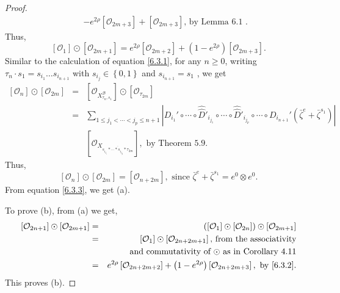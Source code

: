 \documentclass{article}
\def\B{\mathcal{B}}
\def\ref#1{#1}
\begin{document}
\begin{proof}
\begin{eqnarray*}
&&- e^{2\rho} \left[\mathcal{O}_{2m+3}\right] +\left[\mathcal{O}_{2m+3}\right] \mbox{, by Lemma \ref{6.1} }.
\end{eqnarray*}
Thus, 
\begin{equation}\label{6.3.2}
\left[ \mathcal{O}_{1}\right] \odot \left[ \mathcal{O}_{2m+1}\right] = e^{2\rho} \left[\mathcal{O}_{2m+2}\right] +\left(1-e^{2\rho} \right)\left[\mathcal{O}_{2m+3}\right].
\end{equation}
Similar to the calculation of equation \eqref{6.3.1}, for any $n\geq 0$, writing $\tau_n\cdot s_1=s_{i_1}\ldots s_{i_{n+1}}$ with $s_{i_j}\in \left\{ 0,1\right\}$ and $s_{i_{n+1}}=s_1$ , we get
\begin{eqnarray*}
\left[ \mathcal{O}_{n}\right] \odot \left[ \mathcal{O}_{2m}\right]  &=& \left[ \mathcal{O}_{X_{\tau_n,s_1}^\B}\right] \odot \left[\mathcal{O}_{\tau_{2m}}\right]\\
&=& \sum_{1\leq j_1 <\cdots < j_p \leq n+1}\left\vert D_{i_1}' \circ \cdots \circ \hat{\hat{D}}'_{i_{j_1}}\circ \cdots \circ \hat{\hat{D}}'_{i_{j_p}}\circ \cdots \circ D_{i_{n+1}}'\left(\bar{\zeta}^e+\bar{\zeta}^{s_1}\right) \right\vert \\
&&[ \mathcal{O}_{X_{\overline{s_{i_{j_1}}*\cdots * s_{i_{j_p}}*\tau_{2m}}}}],\mbox{ by Theorem \ref{5.9}} .
\end{eqnarray*}
Thus,
\begin{equation}\label{6.3.3}
\left[ \mathcal{O}_{n}\right] \odot \left[ \mathcal{O}_{2m}\right] =  \left[ \mathcal{O}_{n+2m}\right] ,\mbox{ since } \bar{\zeta}^e+\bar{\zeta}^{s_1} = e^0 \otimes e^0.
\end{equation}
From equation \eqref{6.3.3}, we get (a). 

To prove (b), from (a) we get,
\begin{eqnarray*}
\left[ \mathcal{O}_{2n+1}\right] \odot \left[ \mathcal{O}_{2m+1}\right]  &=& \left(\left[ \mathcal{O}_{1}\right] \odot \left[ \mathcal{O}_{2n}\right] \right)\odot  \left[ \mathcal{O}_{2m+1}\right] \\
&=& \left[ \mathcal{O}_{1}\right] \odot \left[ \mathcal{O}_{2n+2m+1}\right] \mbox{, from the associativity}\\
&&\mbox{ and commutativity of $\odot$ as in  Corollary \ref{4.11}}\\
&=&e^{2\rho}\left[ \mathcal{O}_{2n+2m+2}\right] +\left(1-e^{2\rho}\right)\left[ \mathcal{O}_{2n+2m+3}\right], \mbox{  by \eqref{6.3.2}.}
\end{eqnarray*}
This proves (b).
\end{proof}
\end{document}
